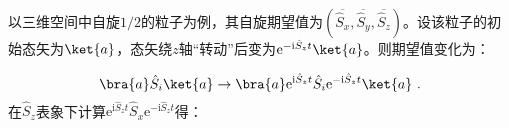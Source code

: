 
\begin{issues}
\issueMissDepend
\issueTODO
\end{issues}



以三维空间中自旋$1/2$的粒子为例，其自旋期望值为$(\overline{\hat S_x},\overline{\hat S_y},\overline{\hat S_z})$。设该粒子的初始态矢为$\ket{a}$，态矢绕$z$轴“转动”后变为$\mathrm e^{-\mathrm i \hat S_zt}\ket{a}$。则期望值变化为：

\begin{equation}
\bra{a}\hat S_i\ket{a}\rightarrow \bra{a}\mathrm e^{\mathrm i \hat S_zt}\hat S_i\mathrm e^{-\mathrm i \hat S_zt}\ket{a}~.
\end{equation}
在$\hat S_z$表象下计算$\mathrm e^{\mathrm i \hat S_zt}\hat S_x\mathrm e^{-\mathrm i \hat S_zt}$得：

